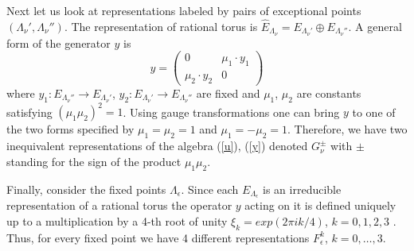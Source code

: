 \documentclass[a4paper,a4paper]{article}
\begin{document}
{Next let us look at representations labeled by pairs of exceptional points $(\Lambda_{\nu}', \Lambda_{\nu}'')$. 
The representation of rational torus is $\hat E_{\Lambda_{\nu}} = E_{\Lambda_{\nu}'}\oplus E_{\Lambda_{\nu}''}$. 
A general form of the  generator $y$ is 
$$
y= \left( 
\begin{array}{cc}
0 & \mu_{1} \cdot y_{1} \\
\mu_{2} \cdot y_{2} & 0 
\end{array}
\right)
$$  
where $y_{1}:  E_{\Lambda_{\nu}''} \to  E_{\Lambda_{\nu}'}$, $y_{2}: E_{\Lambda_{\nu}'}\to  E_{\Lambda_{\nu}''}$ are fixed 
and $\mu_{1}$, $\mu_{2}$ are constants satisfying $(\mu_{1}\mu_{2})^{2}=1$. Using gauge transformations 
one can bring $y$ to one of the two forms specified by $\mu_{1}=\mu_{2}=1$ and $\mu_{1}=-\mu_{2}=1$. 
Therefore, we have two inequivalent representations of the algebra (\ref{u}), (\ref{y}) denoted 
$G^{\pm}_{\nu}$ with $\pm$ standing for the sign of the product $\mu_{1} \mu_{2}$. 
  

Finally, consider the fixed points  $\Lambda_{\epsilon}$. 
Since  each $E_{\Lambda_{\epsilon}}$ is an irreducible representation of a rational torus the operator $y$ acting on it 
is  defined uniquely  up to a multiplication by a 4-th root of unity $\xi_{k}=exp(2\pi ik/4)$, $k=0,1,2,3$ . 
Thus, for every fixed point we have 4 different representations $F_{\epsilon}^{k}$,  $k=0,\dots, 3$. 


}
\end{document}

